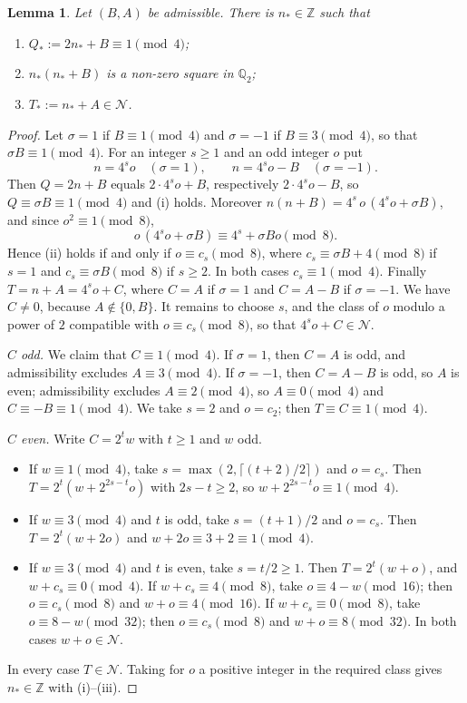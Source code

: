 \documentclass[11pt]{amsart}
\newtheorem{lemma}[theorem]{Lemma}
\theoremstyle{remark}
\theoremstyle{definition}
\numberwithin{equation}{section}
\newcommand{\Nc}{\mathcal{N}}
\newcommand{\Z}{\mathbb{Z}}
\newcommand{\Q}{\mathbb{Q}}
\begin{document}
\begin{lemma}\label{lem:nstar}
Let $(B,A)$ be admissible. There is $n_*\in\Z$ such that
\begin{enumerate}
\item[(i)] $Q_*:=2n_*+B\equiv1\pmod 4$;
\item[(ii)] $n_*(n_*+B)$ is a non-zero square in $\Q_2$;
\item[(iii)] $T_*:=n_*+A\in\Nc$.
\end{enumerate}
\end{lemma}

\begin{proof}
Let $\sigma=1$ if $B\equiv1\pmod 4$ and $\sigma=-1$ if $B\equiv3\pmod4$, so that $\sigma B\equiv1\pmod 4$. For an integer $s\ge1$ and an odd integer $o$ put
\[
n=4^so\quad(\sigma=1),\qquad n=4^so-B\quad(\sigma=-1).
\]
Then $Q=2n+B$ equals $2\cdot4^so+B$, respectively $2\cdot4^so-B$, so $Q\equiv\sigma B\equiv1\pmod 4$ and (i) holds. Moreover $n(n+B)=4^s\,o\,(4^so+\sigma B)$, and since $o^2\equiv1\pmod 8$,
\[
o\,(4^so+\sigma B)\equiv4^s+\sigma Bo\pmod 8 .
\]
Hence (ii) holds if and only if $o\equiv c_s\pmod8$, where $c_s\equiv\sigma B+4\pmod 8$ if $s=1$ and $c_s\equiv\sigma B\pmod8$ if $s\ge2$. In both cases $c_s\equiv1\pmod4$. Finally $T=n+A=4^so+C$, where $C=A$ if $\sigma=1$ and $C=A-B$ if $\sigma=-1$. We have $C\neq0$, because $A\notin\{0,B\}$. It remains to choose $s$, and the class of $o$ modulo a power of $2$ compatible with $o\equiv c_s\pmod 8$, so that $4^so+C\in\Nc$.

\emph{$C$ odd.} We claim that $C\equiv1\pmod 4$. If $\sigma=1$, then $C=A$ is odd, and admissibility excludes $A\equiv3\pmod 4$. If $\sigma=-1$, then $C=A-B$ is odd, so $A$ is even; admissibility excludes $A\equiv2\pmod 4$, so $A\equiv0\pmod 4$ and $C\equiv-B\equiv1\pmod4$. We take $s=2$ and $o=c_2$; then $T\equiv C\equiv1\pmod 4$.

\emph{$C$ even.} Write $C=2^tw$ with $t\ge1$ and $w$ odd.
\begin{itemize}
\item If $w\equiv1\pmod 4$, take $s=\max(2,\lceil(t+2)/2\rceil)$ and $o=c_s$. Then $T=2^t(w+2^{2s-t}o)$ with $2s-t\ge2$, so $w+2^{2s-t}o\equiv1\pmod 4$.
\item If $w\equiv3\pmod 4$ and $t$ is odd, take $s=(t+1)/2$ and $o=c_s$. Then $T=2^t(w+2o)$ and $w+2o\equiv3+2\equiv1\pmod 4$.
\item If $w\equiv3\pmod4$ and $t$ is even, take $s=t/2\ge1$. Then $T=2^t(w+o)$, and $w+c_s\equiv0\pmod 4$. If $w+c_s\equiv4\pmod 8$, take $o\equiv4-w\pmod{16}$; then $o\equiv c_s\pmod 8$ and $w+o\equiv4\pmod{16}$. If $w+c_s\equiv0\pmod8$, take $o\equiv8-w\pmod{32}$; then $o\equiv c_s\pmod 8$ and $w+o\equiv8\pmod{32}$. In both cases $w+o\in\Nc$.
\end{itemize}
In every case $T\in\Nc$. Taking for $o$ a positive integer in the required class gives $n_*\in\Z$ with (i)--(iii).
\end{proof}
\end{document}
